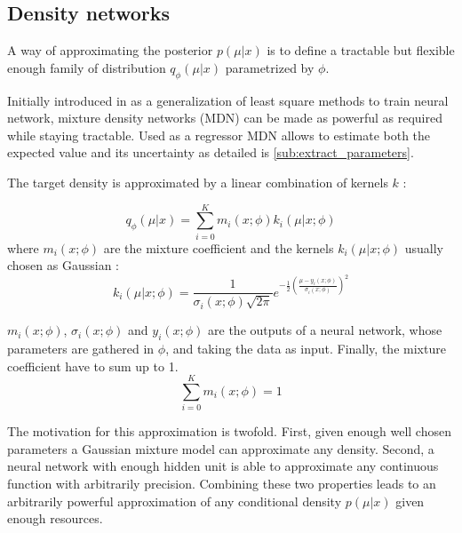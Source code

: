 


\subsection{Density networks} %
\label{sub:density_networks}


A way of approximating the posterior $p(\mu | x)$ is to define a tractable but flexible enough family of distribution $q_\phi(\mu | x)$ parametrized by $\phi$.

Initially introduced in \cite{Bishop94mixturedensity} as a generalization of least square methods to train neural network, mixture density networks (MDN) can be made as powerful as required while staying tractable.
Used as a regressor MDN allows to estimate both the expected value and its uncertainty as detailed is \autoref{sub:extract_parameters}.

The target density is approximated by a linear combination of kernels $k$ :

\begin{equation}
    q_\phi(\mu | x) = \sum_{i=0}^K m_i(x ; \phi) k_i(\mu | x ; \phi)
\end{equation}
where $m_i(x ; \phi)$ are the mixture coefficient
and the kernels $k_i(\mu | x ; \phi)$ usually chosen as Gaussian :
\begin{equation}
    k_i(\mu | x ; \phi) = \frac{1}{\sigma_i(x ; \phi) \sqrt{2 \pi}} e^{- \frac{1}{2} \left ( \frac{\mu-y_i(x ; \phi)}{\sigma_i(x ; \phi)} \right )^2} 
\end{equation}

$m_i(x ; \phi)$, $\sigma_i(x ; \phi)$ and $y_i(x ; \phi)$ are the outputs of a neural network, whose parameters are gathered in $\phi$, and taking the data as input.
Finally, the mixture coefficient have to sum up to 1.
\begin{equation}
    \sum_{i=0}^K m_i(x ; \phi) =  1
\end{equation}

The motivation for this approximation is twofold.
First, given enough well chosen parameters a Gaussian mixture model can approximate any density.
Second, a neural network with enough hidden unit is able to approximate any continuous function with arbitrarily precision.
Combining these two properties leads to an arbitrarily powerful approximation of any conditional density $p(\mu|x)$ given enough resources.








